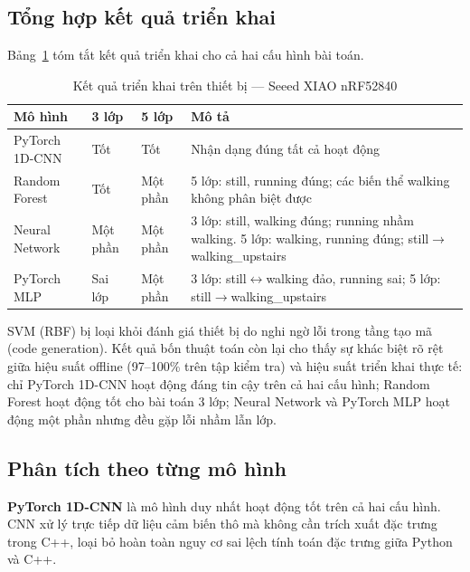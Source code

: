 \subsection{Tổng hợp kết quả triển khai}
\label{sec:deployment_results}

Bảng~\ref{tab:deployment_status} tóm tắt kết quả triển khai cho cả hai cấu hình bài toán.

\begin{table}[H]
    \centering
    \caption{Kết quả triển khai trên thiết bị --- Seeed XIAO nRF52840}
    \label{tab:deployment_status}
    \small
    \begin{tabular}{@{}lllp{5.5cm}@{}}
        \toprule
        Mô hình & 3 lớp & 5 lớp & Mô tả \\
        \midrule
        PyTorch 1D-CNN & Tốt & Tốt & Nhận dạng đúng tất cả hoạt động \\
        Random Forest & Tốt & Một phần & 5 lớp: still, running đúng; các biến thể walking không phân biệt được \\
        Neural Network & Một phần & Một phần & 3 lớp: still, walking đúng; running nhầm walking. 5 lớp: walking, running đúng; still$\to$walking\_upstairs \\
        PyTorch MLP & Sai lớp & Một phần & 3 lớp: still$\leftrightarrow$walking đảo, running sai; 5 lớp: still$\to$walking\_upstairs \\
        \bottomrule
    \end{tabular}
\end{table}

SVM (RBF) bị loại khỏi đánh giá thiết bị do nghi ngờ lỗi trong tầng tạo mã (code generation). Kết quả bốn thuật toán còn lại cho thấy sự khác biệt rõ rệt giữa hiệu suất offline (97--100\% trên tập kiểm tra) và hiệu suất triển khai thực tế: chỉ PyTorch 1D-CNN hoạt động đáng tin cậy trên cả hai cấu hình; Random Forest hoạt động tốt cho bài toán 3 lớp; Neural Network và PyTorch MLP hoạt động một phần nhưng đều gặp lỗi nhầm lẫn lớp.

\subsection{Phân tích theo từng mô hình}
\label{sec:per_model_deployment}

\textbf{PyTorch 1D-CNN} là mô hình duy nhất hoạt động tốt trên cả hai cấu hình. CNN xử lý trực tiếp dữ liệu cảm biến thô mà không cần trích xuất đặc trưng trong C++, loại bỏ hoàn toàn nguy cơ sai lệch tính toán đặc trưng giữa Python và C++.

